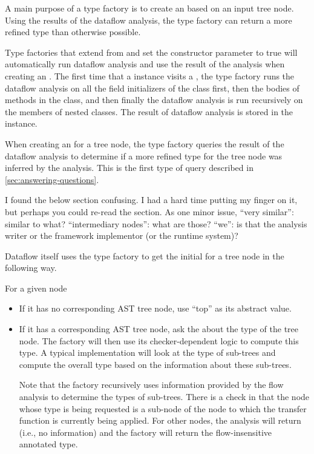 A main purpose of a type factory is to create an 
based on an input tree node. Using the results of the dataflow analysis,
the type factory can return a more refined type than otherwise possible.

Type factories that extend from 
and set the constructor parameter  to true will automatically
run dataflow analysis and use the result of the analysis when creating an
.  The first time that a 
instance visits a , the type factory runs the dataflow analysis
on all the field initializers of the class first, then the bodies of methods in
the class, and then finally the dataflow analysis is
run recursively on the members of nested classes. The result of
dataflow analysis is stored in the  instance.

When creating an  for a tree node, the type factory
queries the result of the dataflow analysis to determine if a more refined
type for the tree node was inferred by the analysis. This is the first
type of query described in \autoref{sec:answering-questions}.

\begin{workinprogress}
I found the below section confusing.  I had a hard time putting my finger
on it, but perhaps you could re-read the section.  As one minor issue,
``very similar'':  similar to what?  ``intermediary nodes'':  what are
those?  ``we'':  is that the analysis writer or the framework implementor
(or the runtime system)?
\end{workinprogress}

Dataflow itself uses the type factory to get the initial
 for a tree node in the following way.

For a given node 
\begin{itemize}
\item
    If it has no corresponding AST tree node, use ``top'' as its
    abstract value.
\item
    If it has a corresponding AST tree node, ask the
     about the type of the tree node.  The
    factory will then use its checker-dependent logic to compute this
    type.  A typical implementation will look at the type of sub-trees
    and compute the overall type based on the information about these
    sub-trees.

    Note that the factory recursively uses information provided by the
    flow analysis to determine the types of sub-trees.  There is a
    check in  that the node whose type is
    being requested is a sub-node of the node to which the transfer
    function is currently being applied.  For other nodes, the
    analysis will return  (i.e., no information) and the
    factory will return the flow-insensitive annotated type.

\end{itemize}

